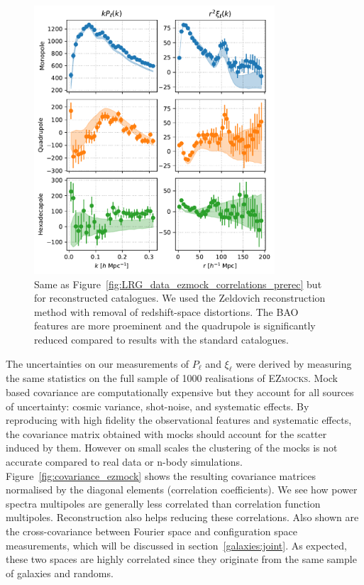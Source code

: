 \begin{figure}
    \centering
    \includegraphics[width=0.8\textwidth]{fig/galaxies/DR16LRG_data_ezmock_postrecon.pdf}
    \caption{Same as Figure~\ref{fig:LRG_data_ezmock_correlations_prerec} but for reconstructed 
    catalogues. We used the Zeldovich reconstruction method with removal of redshift-space distortions. 
    The BAO features are more proeminent and the quadrupole is significantly reduced compared 
    to results with the standard catalogues.    
    }
    \label{fig:LRG_data_ezmock_correlations_postrec}
\end{figure}

The uncertainties on our measurements of $P_\ell$ and $\xi_\ell$ were derived by measuring the 
same statistics on the full sample of 1000 realisations of \textsc{EZmocks}.
Mock based covariance are computationally expensive but they account for all sources of uncertainty: 
cosmic variance, shot-noise, and systematic effects.  By reproducing with 
high fidelity the observational features and systematic effects, the covariance matrix obtained 
with mocks should account for the scatter induced by them. However on small scales the 
clustering of the mocks is not accurate compared to real data or n-body simulations. 
Figure~\ref{fig:covariance_ezmock} shows the resulting covariance matrices normalised by the 
diagonal elements (correlation coefficients). We see how power spectra multipoles are generally 
less correlated than correlation function multipoles. Reconstruction also helps reducing these 
correlations. Also shown are the cross-covariance between Fourier space and configuration space 
measurements, which will be discussed in section~\ref{galaxies:joint}. As expected, these
two spaces are highly correlated since they originate from the same sample of galaxies and randoms. 

